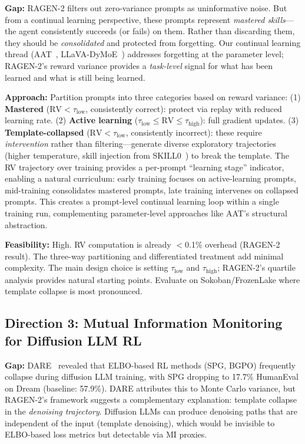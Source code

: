 \documentclass[11pt]{article}
\begin{document}
\textbf{Gap:} RAGEN-2 filters out zero-variance prompts as uninformative noise. But from a continual learning perspective, these prompts represent \textit{mastered skills}---the agent consistently succeeds (or fails) on them. Rather than discarding them, they should be \textit{consolidated} and protected from forgetting. Our continual learning thread (AAT~\cite{aat}, LLaVA-DyMoE~\cite{dymoe}) addresses forgetting at the parameter level; RAGEN-2's reward variance provides a \textit{task-level} signal for what has been learned and what is still being learned.

\textbf{Approach:} Partition prompts into three categories based on reward variance: (1) \textbf{Mastered} ($\mathrm{RV} < \tau_{\mathrm{low}}$, consistently correct): protect via replay with reduced learning rate. (2) \textbf{Active learning} ($\tau_{\mathrm{low}} \leq \mathrm{RV} \leq \tau_{\mathrm{high}}$): full gradient updates. (3) \textbf{Template-collapsed} ($\mathrm{RV} < \tau_{\mathrm{low}}$, consistently incorrect): these require \textit{intervention} rather than filtering---generate diverse exploratory trajectories (higher temperature, skill injection from SKILL0~\cite{skill0}) to break the template. The RV trajectory over training provides a per-prompt ``learning stage'' indicator, enabling a natural curriculum: early training focuses on active-learning prompts, mid-training consolidates mastered prompts, late training intervenes on collapsed prompts. This creates a prompt-level continual learning loop within a single training run, complementing parameter-level approaches like AAT's structural abstraction.

\textbf{Feasibility:} High. RV computation is already $<$0.1\% overhead (RAGEN-2 result). The three-way partitioning and differentiated treatment add minimal complexity. The main design choice is setting $\tau_{\mathrm{low}}$ and $\tau_{\mathrm{high}}$; RAGEN-2's quartile analysis provides natural starting points. Evaluate on Sokoban/FrozenLake where template collapse is most pronounced.

\subsection{Direction 3: Mutual Information Monitoring for Diffusion LLM RL}

\textbf{Gap:} DARE~\cite{dare} revealed that ELBO-based RL methods (SPG, BGPO) frequently collapse during diffusion LLM training, with SPG dropping to 17.7\% HumanEval on Dream (baseline: 57.9\%). DARE attributes this to Monte Carlo variance, but RAGEN-2's framework suggests a complementary explanation: template collapse in the \textit{denoising trajectory}. Diffusion LLMs can produce denoising paths that are independent of the input (template denoising), which would be invisible to ELBO-based loss metrics but detectable via MI proxies.
\end{document}
